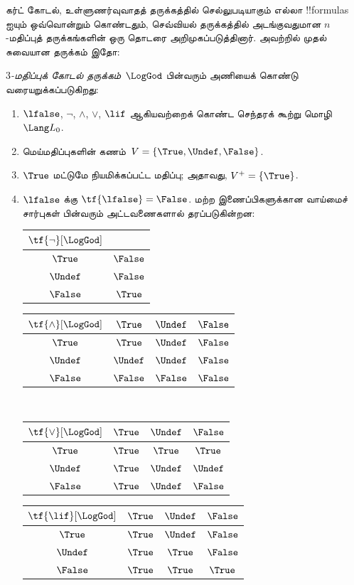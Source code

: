 \documentclass[../../../include/open-logic-section]{subfiles}
\begin{document}


கர்ட் கோடல், உள்ளுணர்வுவாதத் தருக்கத்தில் செல்லுபடியாகும் எல்லா
!!{formula}s ஐயும் ஒவ்வொன்றும் கொண்டதும், செவ்வியல் தருக்கத்தில்
அடங்குவதுமான $n$-மதிப்புத் தருக்கங்களின் ஒரு தொடரை அறிமுகப்படுத்தினார்.
அவற்றில் முதல் சுவையான தருக்கம் இதோ:

\begin{defn}
\emph{$3$-மதிப்புக் கோடல் தருக்கம்}~$\LogGod$ பின்வரும் அணியைக் கொண்டு
வரையறுக்கப்படுகிறது:
\begin{enumerate}
  \item $\lfalse$, $\lnot$, $\land$, $\lor$, $\lif$ ஆகியவற்றைக் கொண்ட
  செந்தரக் கூற்று மொழி~$\Lang L_0$.
  \item மெய்மதிப்புகளின் கணம்~$V = \{\True, \Undef, \False\}$.
  \item $\True$ மட்டுமே நியமிக்கப்பட்ட மதிப்பு; அதாவது,
  $V^+ = \{\True\}$.
  \item $\lfalse$ க்கு $\tf{\lfalse} = \False$. மற்ற இணைப்பிகளுக்கான
  வாய்மைச் சார்புகள் பின்வரும் அட்டவணைகளால் தரப்படுகின்றன:
  \begin{center}
    \begin{tabular}{c|c}
      $\tf{\lnot}[\LogGod]$ & \\
      \hline
      $\True$ & $\False$ \\
      $\Undef$ & $\False$ \\
      $\False$ & $\True$
    \end{tabular}
    \quad
    \begin{tabular}{c|ccc}
      $\tf{\land}[\LogGod]$ & $\True$ & $\Undef$ & $\False$ \\
      \hline
      $\True$ & $\True$ & $\Undef$ & $\False$ \\
      $\Undef$ & $\Undef$ & $\Undef$ & $\False$\\
      $\False$ & $\False$ & $\False$ & $\False$
    \end{tabular}
    \\[2ex]
    \begin{tabular}{c|ccc}
      $\tf{\lor}[\LogGod]$ & $\True$ & $\Undef$ & $\False$ \\
      \hline
      $\True$ & $\True$ & $\True$ & $\True$ \\
      $\Undef$ & $\True$ & $\Undef$ & $\Undef$ \\
      $\False$ & $\True$ & $\Undef$ & $\False$
    \end{tabular}
    \quad
    \begin{tabular}{c|ccc}
      $\tf{\lif}[\LogGod]$ & $\True$ & $\Undef$ & $\False$ \\
      \hline
      $\True$ & $\True$ & $\Undef$ & $\False$ \\
      $\Undef$ & $\True$ & $\True$ & $\False$  \\
      $\False$ & $\True$ & $\True$ & $\True$
    \end{tabular}
  \end{center}
\end{enumerate}
\end{defn}
\end{document}
